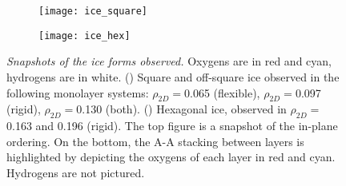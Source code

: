 \documentclass[12pt]{article}
\begin{document}
\begin{figure}[h!]
	\centering
	\begin{subfigure}[b]{0.395\textwidth}
    		\texttt{[image: ice\_square]}
		\caption{}
        		\label{fig:ice_sq}
  	\end{subfigure}
	\begin{subfigure}[b]{0.285\textwidth}
    		\texttt{[image: ice\_hex]}
		\caption{}
        		\label{fig:ice_hx}
  	\end{subfigure}
	\caption{\textit{Snapshots of the ice forms observed.} Oxygens are in red and cyan, hydrogens are in white. (\protect{}) Square and off-square ice observed in the following monolayer systems: \(\rho_{2D}=\)0.065 (flexible), \(\rho_{2D}=\)0.097 (rigid), \(\rho_{2D}=\)0.130 (both). (\protect{}) Hexagonal ice, observed in \(\rho_{2D}=\)0.163 and 0.196 (rigid). The top figure is a snapshot of the in-plane ordering. On the bottom, the A-A stacking between layers is highlighted by depicting the oxygens of each layer in red and cyan. Hydrogens are not pictured.}
	\label{fig:ice_figs}
\end{figure}

\clearpage
\printbibliography
\end{document}
